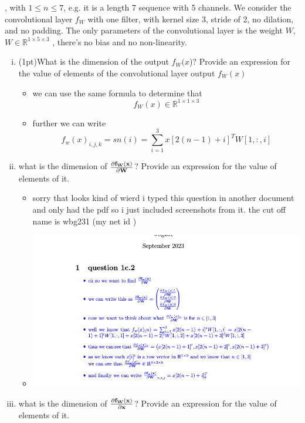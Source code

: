 \documentclass{article}
\begin{document}
\begin{enumerate}[(a)]
, with $1 \leq n \leq 7$, e.g. it is a length 7 sequence with 5 channels. We consider the convolutional layer $f_W$ with one
filter, with kernel size 3, stride of 2, no dilation, and no padding. The only
parameters of the convolutional layer is the weight $W$, $W \in \mathbb{R}^{1\times 5\times 3}$
, there’s
no bias and no non-linearity.
\begin{enumerate}[i.]
    \item (1pt)What is the dimension of the output $f_W (x$)? Provide an expression for the value of elements of the convolutional layer output $f_W(x)$
    \begin{itemize}
        \color{blue} 
        \item we can use the same formula to determine that $$f_{W}(x)\in \mathbb{R}^{1\times 1 \times 3}$$
        \item further we can write $$f_{w}(x)_{i,j,k}=sn(i)=\sum_{i=1}^{3}x[2(n-1) + i]^{T}W[1,:,i]$$  
    \end{itemize}
    \item what is the dimension of $\frac{\bold{\partial f_W(x)}}{\partial \bold{W}}$? Provide an expression for the value of elements of it. 
    \begin{itemize}
        \color{blue}
        \item sorry that looks kind of wierd i typed this question in another document and only had the pdf so i just included screenshots from it. the cut off name is wbg231 (my net id )
        \item \includegraphics*{./assigment_screenshots/part_1.png}
    \end{itemize}
    \item what is the dimension of $\frac{\bold{\partial f_W(x)}}{\partial \bold{x}}$? Provide an expression for the value of elements of it.
    \begin{itemize}
        \color{blue}


\end{itemize}
\end{enumerate}
\end{enumerate}
\end{document}
